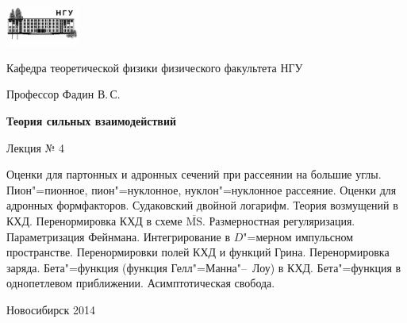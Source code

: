 \documentclass[12pt,pagesize,paper=192mm:108mm]{scrbook}
\begin{document}
\begin{titlepage}
  \vspace*{-1em}
  \begin{center}
    \includegraphics[width=0.18\textwidth]{../NSU-logo}

    Кафедра теоретической физики физического факультета НГУ
    \medskip

    \Large
    Профессор Фадин В.\,С.

    \huge
    \textbf{Теория сильных взаимодействий}
    \smallskip
    
    \Large
    Лекция № 4
    \vfill
    
    \normalsize
    \begin{minipage}{0.9\linewidth}
      Оценки для партонных и адронных сечений при рассеянии на большие
      углы. Пион"=пионное, пион"=нуклонное, нуклон"=нуклонное
      рассеяние. Оценки для адронных формфакторов. Судаковский двойной
      логарифм. Теория возмущений в КХД. Перенормировка КХД в схеме
      $\overline{\text{MS}}$. Размерностная регуляризация. Параметризация
      Фейнмана. Интегрирование в $D$"=мерном импульсном
      пространстве. Перенормировки полей КХД и функций
      Грина. Перенормировка заряда. Бета"=функция (функция
      Гелл"=Манна"--~Лоу) в КХД. Бета"=функция в однопетлевом
      приближении. Асимптотическая свобода.
    \end{minipage}
    \vfill
    
    \normalsize \ccbysa\hspace{0.5em}  Новосибирск 2014   
  \end{center}
\end{titlepage}
\end{document}
